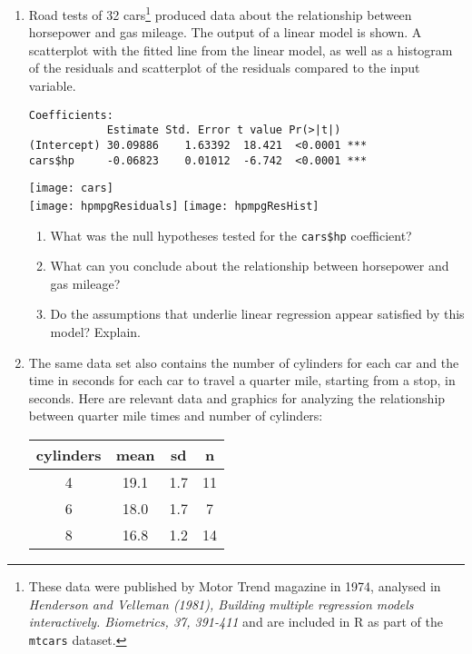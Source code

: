 \documentclass[12pt,fullpage]{amsart}
\begin{document}
\begin{enumerate}
\vfill
  
  \newpage
  
\item Road tests of 32 cars\footnote{These data were published by Motor Trend magazine in 1974, analysed in \emph{Henderson and Velleman (1981), Building multiple regression models interactively. Biometrics, 37, 391-411} and are included in R as part of the \texttt{mtcars} dataset.} produced data about the relationship between horsepower and gas mileage. The output of a linear model is shown. A scatterplot with the fitted line from the linear model, as well as a histogram of the residuals and scatterplot of the residuals compared to the input variable.
\begin{verbatim}
Coefficients:
            Estimate Std. Error t value Pr(>|t|)    
(Intercept) 30.09886    1.63392  18.421  <0.0001 ***
cars$hp     -0.06823    0.01012  -6.742  <0.0001 ***
\end{verbatim}

\begin{center}
  \texttt{[image: cars]}\\
  \texttt{[image: hpmpgResiduals]}\quad
  \texttt{[image: hpmpgResHist]}
\end{center}

  \begin{enumerate}
  \item What was the null hypotheses tested for the \texttt{cars\$hp} coefficient?

  \item What can you conclude about the relationship between horsepower and gas mileage?

\item Do the assumptions that underlie linear regression appear satisfied by this model? Explain.

  \end{enumerate}

  \vfill
  
\item The same data set also contains the number of cylinders for each car and the time in seconds for each car to travel a quarter mile, starting from a stop, in seconds. Here are relevant data and graphics for analyzing the relationship between quarter mile times and number of cylinders:
  
\begin{tabular}{c|ccc}
cylinders& mean & sd & n\\
\hline
4 & 19.1 & 1.7 & 11\\
6 & 18.0 & 1.7 & 7\\
8 & 16.8 & 1.2 & 14
\end{tabular}


\end{enumerate}
\end{document}
